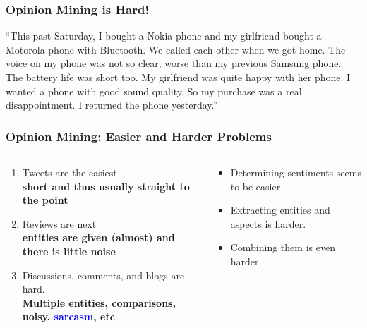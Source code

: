 \documentclass[t]{beamer}
\begin{document}
\begin{frame} \frametitle{Opinion Mining is Hard!} %

\begin{block}{}
``This past Saturday, I bought a Nokia phone and my girlfriend bought a
Motorola phone with Bluetooth. We called each other when we got
home. The voice on my phone was not so clear, worse than my previous
Samsung phone. The battery life was short too. My girlfriend was quite
happy with her phone. I wanted a phone with good sound quality. So my
purchase was a real disappointment. I returned the phone yesterday.''
\end{block}

\end{frame} 


\begin{frame} \frametitle{Opinion Mining: Easier and Harder Problems} %

\begin{columns}[T]

\begin{column}{0.5 \textwidth}

\begin{enumerate}

\item Tweets are the easiest \\
\textbf{short and thus usually straight to the point} 

\item Reviews are next\\
\textbf{entities are given (almost) and there is little noise} 

\item Discussions, comments, and blogs are hard.\\
\textbf{Multiple entities, comparisons, noisy, \textcolor{blue}{sarcasm}, etc}
\end{enumerate}

\end{column}

\begin{column}{0.5 \textwidth}

\begin{block}{}
\begin{itemize}
\item Determining sentiments seems to be easier. 
\item Extracting entities and aspects is harder. 
\item Combining them is even harder.
\end{itemize}
\end{block}

\end{column}

\end{columns}
\end{frame} 
\end{document}
